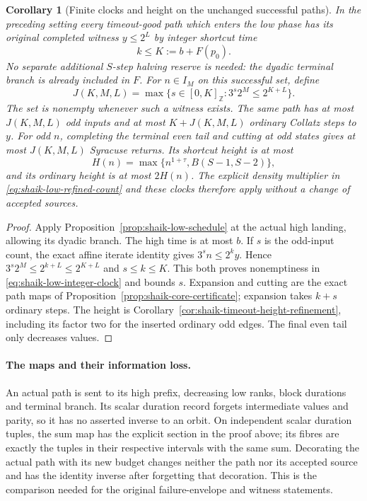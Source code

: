 \documentclass[11pt]{article}
\newtheorem{corollary}[proposition]{Corollary}
\theoremstyle{remark}\newtheorem{remark}[proposition]{Remark}
\begin{document}
\begin{corollary}[Finite clocks and height on the unchanged successful paths]
\label{cor:shaik-low-schedule-clocks}
In the preceding setting every timeout-good path which enters
the low phase has its original completed witness \(y\le2^L\) by
integer shortcut time
\[
 k\le K:=b+F(p_0).
\]
No separate additional \(S\)-step halving reserve is needed:
the dyadic terminal branch is already included in \(F\).
For \(n\in I_M\) on this successful set, define
\begin{equation}\label{eq:shaik-low-integer-clock}
 J(K,M,L)=\max\{s\in[0,K]_{\mathbb Z}:3^s2^M\le2^{K+L}\}.
\end{equation}
The set is nonempty whenever such a witness exists.
The same path has at most \(J(K,M,L)\) odd inputs and at most
\(K+J(K,M,L)\) ordinary Collatz steps to \(y\).
For odd \(n\), completing the terminal even tail and cutting at odd
states gives at most \(J(K,M,L)\) Syracuse returns.
Its shortcut height is at most
\[
 H(n)=\max\{n^{1+\tau}, B(S-1,S-2)\},
\]
and its ordinary height is at most \(2H(n)\).
The explicit density multiplier in \eqref{eq:shaik-low-refined-count}
and these clocks therefore apply without a change of accepted sources.
\end{corollary}
\begin{proof}
Apply Proposition~\ref{prop:shaik-low-schedule} at the actual high
landing, allowing its dyadic branch. The high time is at most \(b\).
If \(s\) is the odd-input count, the exact affine iterate identity gives
\(3^sn\le2^ky\). Hence
\(3^s2^M\le2^{k+L}\le2^{K+L}\) and \(s\le k\le K\).
This both proves nonemptiness in \eqref{eq:shaik-low-integer-clock}
and bounds \(s\). Expansion and cutting are the exact path maps
of Proposition~\ref{prop:shaik-core-certificate}; expansion takes
\(k+s\) ordinary steps. The height is
Corollary~\ref{cor:shaik-timeout-height-refinement}, including its
factor two for the inserted ordinary odd edges. The final even
tail only decreases values.
\end{proof}

\paragraph{The maps and their information loss.}
An actual path is sent to its high prefix, decreasing low ranks,
block durations and terminal branch. Its scalar duration record
forgets intermediate values and parity, so it has no asserted
inverse to an orbit. On independent scalar duration tuples, the
sum map has the explicit section in the proof above; its fibres
are exactly the tuples in their respective intervals with the
same sum. Decorating the actual path with its new budget changes
neither the path nor its accepted source and has the identity
inverse after forgetting that decoration. This is the comparison
needed for the original failure-envelope and witness statements.
\end{document}
